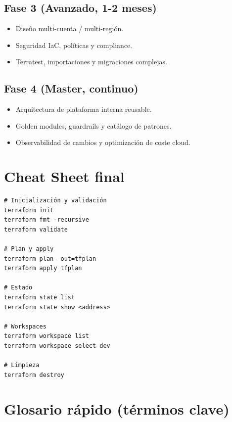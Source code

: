 \documentclass[12pt,a4paper]{article}
\begin{document}
\subsection*{Fase 3 (Avanzado, 1-2 meses)}
\begin{itemize}
		\item Diseño multi-cuenta / multi-región.
		\item Seguridad IaC, políticas y compliance.
		\item Terratest, importaciones y migraciones complejas.
\end{itemize}

\subsection*{Fase 4 (Master, continuo)}
\begin{itemize}
		\item Arquitectura de plataforma interna reusable.
		\item Golden modules, guardrails y catálogo de patrones.
		\item Observabilidad de cambios y optimización de coste cloud.
\end{itemize}

\section{Cheat Sheet final}

\begin{lstlisting}[caption=Comandos que debes dominar]
# Inicialización y validación
terraform init
terraform fmt -recursive
terraform validate

# Plan y apply
terraform plan -out=tfplan
terraform apply tfplan

# Estado
terraform state list
terraform state show <address>

# Workspaces
terraform workspace list
terraform workspace select dev

# Limpieza
terraform destroy
\end{lstlisting}

\section{Glosario rápido (términos clave)}
\end{document}
